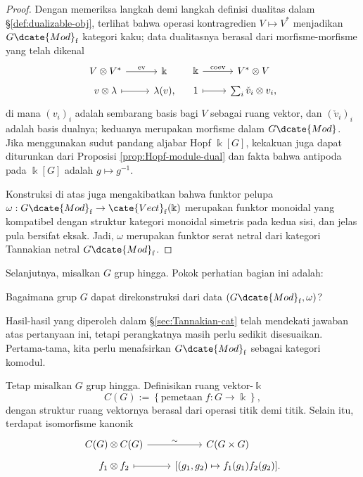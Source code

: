 \begin{proof}
	Dengan memeriksa langkah demi langkah definisi dualitas dalam \S\ref{def:dualizable-obj}, terlihat bahwa operasi kontragredien $V \mapsto V^*$ menjadikan $G\dcate{Mod}_{\mathrm{f}}$ kategori kaku; data dualitasnya berasal dari morfisme-morfisme yang telah dikenal
	\[\begin{tikzcd}[row sep=tiny]
		V \otimes V^* \arrow[r, "{\mathrm{ev}}"] & \Bbbk \\
		v \otimes \lambda \arrow[mapsto, r] & \lambda(v),
	\end{tikzcd} \quad \begin{tikzcd}[row sep=tiny]
		\Bbbk \arrow[r, "{\mathrm{coev}}"] & V^* \otimes V \\
		1 \arrow[mapsto, r] & \sum_i \check{v}_i \otimes v_i,
	\end{tikzcd}\]
	di mana $(v_i)_i$ adalah sembarang basis bagi $V$ sebagai ruang vektor, dan
	$(\check{v}_i)_i$ adalah basis dualnya; keduanya merupakan morfisme dalam
	$G\dcate{Mod}$. Jika menggunakan sudut pandang aljabar Hopf $\Bbbk[G]$,
	kekakuan juga dapat diturunkan dari Proposisi \ref{prop:Hopf-module-dual}
	dan fakta bahwa antipoda pada $\Bbbk[G]$ adalah $g \mapsto g^{-1}$.
	
	Konstruksi di atas juga mengakibatkan bahwa funktor pelupa $\omega: G\dcate{Mod}_{\mathrm{f}} \to \cate{Vect}_{\mathrm{f}}(\Bbbk)$ merupakan funktor monoidal yang kompatibel dengan struktur kategori monoidal simetris pada kedua sisi, dan jelas pula bersifat eksak. Jadi, $\omega$ merupakan funktor serat netral dari kategori Tannakian netral $G\dcate{Mod}_{\mathrm{f}}$.
\end{proof}

Selanjutnya, misalkan $G$ grup hingga. Pokok perhatian bagian ini adalah:
\begin{center}
	Bagaimana grup $G$ dapat direkonstruksi dari data $\left(G\dcate{Mod}_{\mathrm{f}}, \omega\right)$?
\end{center}
Hasil-hasil yang diperoleh dalam \S\ref{sec:Tannakian-cat} telah mendekati jawaban atas pertanyaan ini, tetapi perangkatnya masih perlu sedikit disesuaikan. Pertama-tama, kita perlu menafsirkan $G\dcate{Mod}_{\mathrm{f}}$ sebagai kategori komodul.

\begin{definition}
	Tetap misalkan $G$ grup hingga. Definisikan ruang vektor-$\Bbbk$
	\[ C(G) := \left\{\text{pemetaan}\; f: G \to \Bbbk \right\}, \]
	dengan struktur ruang vektornya berasal dari operasi titik demi titik. Selain itu, terdapat isomorfisme kanonik
	\[\begin{tikzcd}[row sep=tiny]
		C(G) \otimes C(G) \arrow[r, "\sim"] & C(G \times G) \\
		f_1 \otimes f_2 \arrow[mapsto, r] & {[(g_1, g_2) \mapsto f_1(g_1) f_2(g_2)]}.
	\end{tikzcd}\]
\end{definition}

